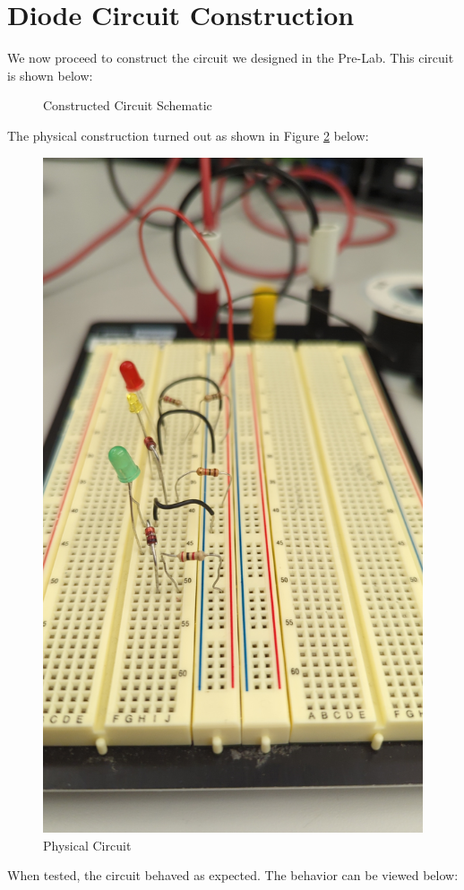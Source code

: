 \documentclass[
	letterpaper, %
	10pt, %
]{CSUniSchoolLabReport}
\begin{document}
  \section{Diode Circuit Construction}

  We now proceed to construct the circuit we designed in the Pre-Lab. This circuit is shown below:

  \begin{figure}[H]
    \centering
    
    \caption{Constructed Circuit Schematic}
    \label{fig:3}
  \end{figure}

  The physical construction turned out as shown in Figure \ref{fig:4} below:

  \begin{figure}[H]
    \centering
    \includegraphics[width=.7\textwidth,angle=270]{Figures/L2F3}
    \caption{Physical Circuit}
    \label{fig:4}
  \end{figure}

  When tested, the circuit behaved as expected. The behavior can be viewed below:
\end{document}
